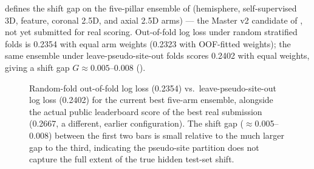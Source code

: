 \documentclass[10pt]{article}
\newcommand{\shiftgap}{\ensuremath{G}}
\begin{document}
 defines the shift gap on the five-pillar ensemble of  (hemisphere, self-supervised 3D, feature, coronal 2.5D, and axial 2.5D arms) --- the Master v2 candidate of , not yet submitted for real scoring. Out-of-fold log loss under random stratified folds is 0.2354 with equal arm weights (0.2323 with OOF-fitted weights); the same ensemble under leave-pseudo-site-out folds scores 0.2402 with equal weights, giving a shift gap $\shiftgap \approx 0.005$--$0.008$ ().

\begin{figure}[t]
\centering
{}
\caption{Random-fold out-of-fold log loss (0.2354) vs.\ leave-pseudo-site-out log loss (0.2402) for the current best five-arm ensemble, alongside the actual public leaderboard score of the best real submission (0.2667, a different, earlier configuration). The shift gap ($\approx$0.005--0.008) between the first two bars is small relative to the much larger gap to the third, indicating the pseudo-site partition does not capture the full extent of the true hidden test-set shift.}
\label{fig:shiftgap}
\end{figure}
\end{document}
